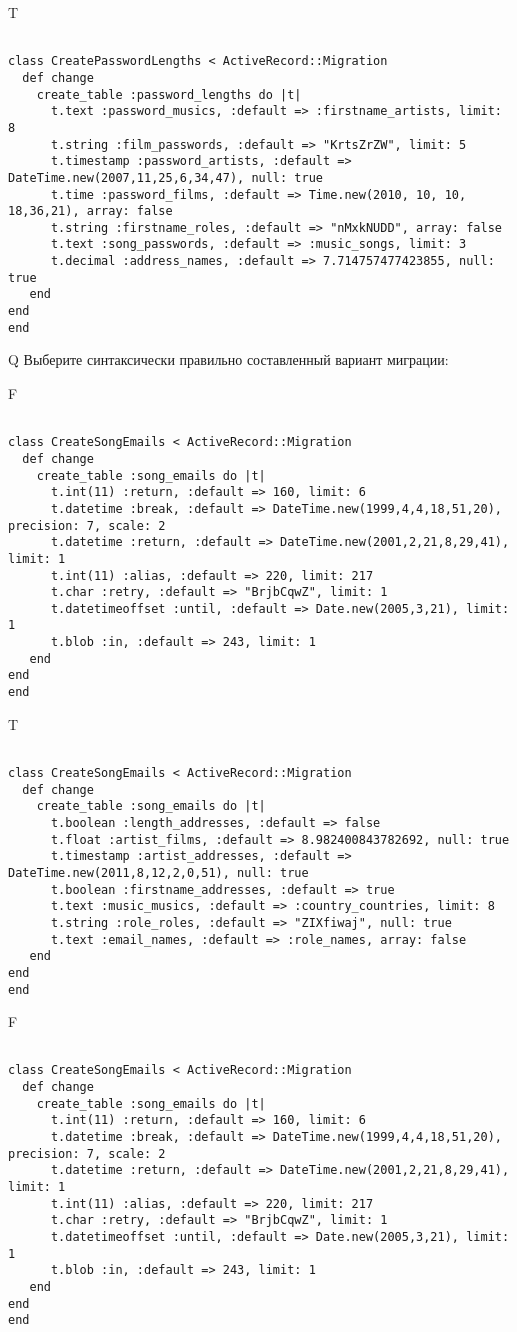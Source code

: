 T
\begin{verbatim}
		
class CreatePasswordLengths < ActiveRecord::Migration 
  def change 
    create_table :password_lengths do |t| 
      t.text :password_musics, :default => :firstname_artists, limit: 8
      t.string :film_passwords, :default => "KrtsZrZW", limit: 5
      t.timestamp :password_artists, :default => DateTime.new(2007,11,25,6,34,47), null: true
      t.time :password_films, :default => Time.new(2010, 10, 10, 18,36,21), array: false
      t.string :firstname_roles, :default => "nMxkNUDD", array: false
      t.text :song_passwords, :default => :music_songs, limit: 3
      t.decimal :address_names, :default => 7.714757477423855, null: true
   end
end
end
\end{verbatim}

Q
Выберите синтаксически правильно составленный вариант миграции:

F
\begin{verbatim}
		
class CreateSongEmails < ActiveRecord::Migration 
  def change 
    create_table :song_emails do |t| 
      t.int(11) :return, :default => 160, limit: 6
      t.datetime :break, :default => DateTime.new(1999,4,4,18,51,20), precision: 7, scale: 2
      t.datetime :return, :default => DateTime.new(2001,2,21,8,29,41), limit: 1
      t.int(11) :alias, :default => 220, limit: 217
      t.char :retry, :default => "BrjbCqwZ", limit: 1
      t.datetimeoffset :until, :default => Date.new(2005,3,21), limit: 1
      t.blob :in, :default => 243, limit: 1
   end
end
end
\end{verbatim}

T
\begin{verbatim}
		
class CreateSongEmails < ActiveRecord::Migration 
  def change 
    create_table :song_emails do |t| 
      t.boolean :length_addresses, :default => false
      t.float :artist_films, :default => 8.982400843782692, null: true
      t.timestamp :artist_addresses, :default => DateTime.new(2011,8,12,2,0,51), null: true
      t.boolean :firstname_addresses, :default => true
      t.text :music_musics, :default => :country_countries, limit: 8
      t.string :role_roles, :default => "ZIXfiwaj", null: true
      t.text :email_names, :default => :role_names, array: false
   end
end
end
\end{verbatim}

F
\begin{verbatim}
		
class CreateSongEmails < ActiveRecord::Migration 
  def change 
    create_table :song_emails do |t| 
      t.int(11) :return, :default => 160, limit: 6
      t.datetime :break, :default => DateTime.new(1999,4,4,18,51,20), precision: 7, scale: 2
      t.datetime :return, :default => DateTime.new(2001,2,21,8,29,41), limit: 1
      t.int(11) :alias, :default => 220, limit: 217
      t.char :retry, :default => "BrjbCqwZ", limit: 1
      t.datetimeoffset :until, :default => Date.new(2005,3,21), limit: 1
      t.blob :in, :default => 243, limit: 1
   end
end
end
\end{verbatim}

